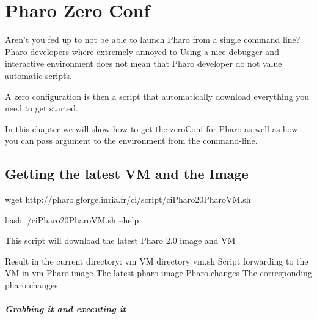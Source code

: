 \documentclass[a4paper,10pt,twoside]{book}
\begin{document}
\fi
\sloppy

\chapter{Pharo Zero Conf}




Aren't you  fed up to not be able to launch Pharo from a single command line? Pharo developers where extremely annoyed to 
Using a nice debugger and interactive environment does not 
mean that Pharo developer do not value automatic scripts. 

A zero configuration is then a script that automatically download everything you need to get started. 

In this chapter we will show how to get the zeroConf for Pharo as well as how you can pass argument to the environment from the command-line.





\section{Getting the latest VM and the Image}

\begin{code}{}
wget http://pharo.gforge.inria.fr/ci/script/ciPharo20PharoVM.sh
\end{code}


\begin{code}{}
bash ./ciPharo20PharoVM.sh --help 
\end{code}

\begin{code}{}
This script will download the latest Pharo 2.0 image and VM

Result in the current directory:
    vm               VM directory
    vm.sh            Script forwarding to the VM in vm
    Pharo.image      The latest pharo image
    Pharo.changes    The corresponding pharo changes
\end{code}


\paragraph{Grabbing it and executing it}
\end{document}
